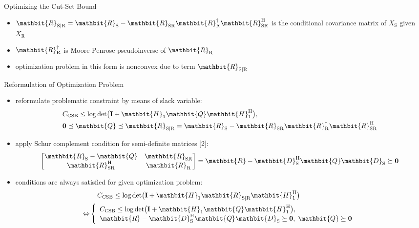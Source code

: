 \documentclass[a0,landscape,3col,print]{msvposter}
\newcommand{\Hone}{\mathbit{H}_{1}}
\newcommand{\zero}{\boldsymbol{0}}
\newcommand{\id}{\mathbf{I}}
\newcommand{\Q}{\mathbit{Q}}
\newcommand{\R}{\mathbit{R}}
\newcommand{\Rs}{\mathbit{R}_{\mathrm{S}}}
\newcommand{\Rr}{\mathbit{R}_{\mathrm{R}}}
\newcommand{\Rsr}{\mathbit{R}_{\mathrm{SR}}}
\newcommand{\Rsgr}{\mathbit{R}_{\mathrm{S}|\mathrm{R}}}
\newcommand{\Ds}{\mathbit{D}_{\mathrm{S}}}
\newcommand{\he}{\operatorname{H}}
\newcommand{\psd}{\succeq}
\newcommand{\nsd}{\preceq}
\newcommand{\CSB}{C_{\text{CSB}}}
\newcommand{\marked}[1]{#1}
\begin{document}
\begin{poster}
\begin{postercolumn}
\begin{posterbox}{Optimizing the Cut-Set Bound}
\begin{itemize}
        \item $\Rsgr = \Rs - \Rsr \Rr^{\dagger} \Rsr^{\he}$ is the conditional covariance matrix of $X_{\text{S}}$ given $X_{\text{R}}$

        \item $\Rr^{\dagger}$ is Moore-Penrose pseudoinverse of $\Rr$

        \item optimization problem in this form is \alert{nonconvex} due to term $\Rsgr$
    \end{itemize}
\end{posterbox}

\begin{posterbox}{Reformulation of Optimization Problem}
    \begin{itemize}\itemsep7mm
        \item reformulate problematic constraint by means of slack variable:
        \begin{align*}
            &\CSB \leq \log\det \bigl( \id + \Hone \Q \Hone^{\he} \bigr), \\ &\zero \nsd \Q \nsd \Rsgr = \Rs - \Rsr \Rr^{\dagger} \Rsr^{\he}
        \end{align*}

        \item apply Schur complement condition for semi-definite matrices \marked{[2]}:
            \begin{align*}
                \begin{bmatrix} \Rs - \Q & \Rsr \\ \Rsr^{\he} & \Rr \end{bmatrix} = \R - \Ds^{\he} \Q \Ds \psd \zero
            \end{align*}

        \item conditions are always satisfied for given optimization problem:
        \begin{align*}
            &\;\;\;\;\CSB \leq \log\det \bigl( \id + \Hone \Rsgr \Hone^{\he} \bigr) \\
            \Leftrightarrow &\left\{
            \begin{array}{l}
                \CSB \leq \log\det \bigl( \id + \Hone \Q \Hone^{\he} \bigr), \\
                \R - \Ds^{\he} \Q \Ds \psd \zero, \; \Q \psd \zero
            \end{array}
            \right.
        \end{align*}


\end{itemize}
\end{posterbox}
\end{postercolumn}
\end{poster}
\end{document}
